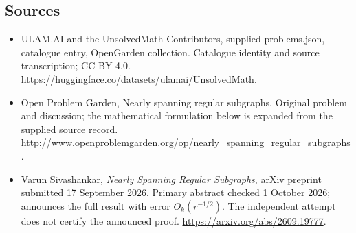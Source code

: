 \documentclass[11pt,a4paper]{article}
\begin{document}
\subsection{Sources}
\begin{itemize}
\item[S1] ULAM.AI and the UnsolvedMath Contributors, supplied problems.json, catalogue entry, OpenGarden collection. Catalogue identity and source transcription; CC BY 4.0.
\url{https://huggingface.co/datasets/ulamai/UnsolvedMath}.
\item[S2] Open Problem Garden, Nearly spanning regular subgraphs. Original problem and discussion; the mathematical formulation below is expanded from the supplied source record.
\url{http://www.openproblemgarden.org/op/nearly_spanning_regular_subgraphs}.

\item[R1] Varun Sivashankar, \emph{Nearly Spanning Regular Subgraphs},
arXiv preprint submitted 17 September 2026. Primary abstract checked
1 October 2026; announces the full result with error $O_k(r^{-1/2})$.
The independent attempt does not certify the announced proof.
\url{https://arxiv.org/abs/2609.19777}.

\end{itemize}
\end{document}
